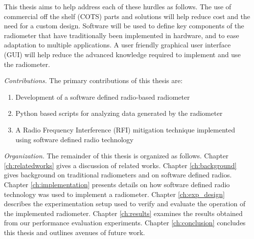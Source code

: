 This thesis aims to help address each of these hurdles as follows.  The use of commercial off the shelf (COTS) parts and solutions will help reduce cost and the need for a custom design.  Software will be used to define key components of the radiometer that have traditionally been implemented in hardware, and to ease adaptation to multiple applications.  A user friendly graphical user interface (GUI) will help reduce the advanced knowledge required to implement and use the radiometer. 

\emph{Contributions.}  The primary contributions of this thesis are:

\begin{enumerate}
\item Development of a software defined radio-based radiometer
\item Python based scripts for analyzing data generated by the radiometer
\item A Radio Frequency Interference (RFI) mitigation technique implemented using software defined radio technology
\end{enumerate}

\emph{Organization.}  The remainder of this thesis is organized as follows.  Chapter \ref{ch:relatedworks} gives a discussion of related works.  Chapter \ref{ch:background} gives background on traditional radiometers and on software defined radios.  Chapter \ref{ch:implementation} presents details on how software defined radio technology was used to implement a radiometer.  Chapter \ref{ch:exp_design} describes the experimentation setup used to verify and evaluate the operation of the implemented radiometer.  Chapter \ref{ch:results} examines the results obtained from our performance evaluation experiments.  Chapter \ref{ch:conclusion} concludes this thesis and outlines avenues of future work.

